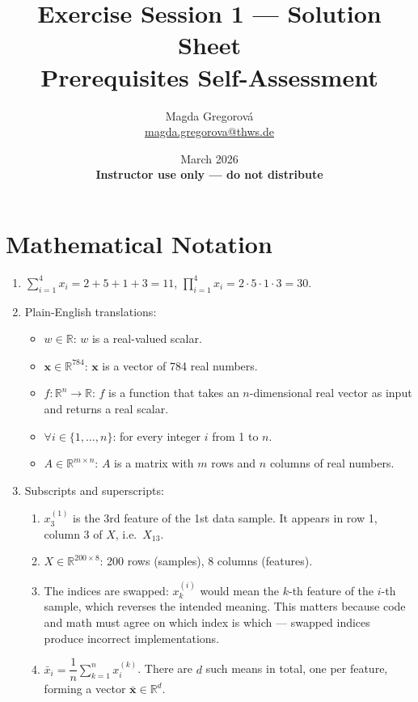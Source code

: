 \documentclass[12pt, a4paper]{scrartcl}
\title{Exercise Session 1 --- Solution Sheet\\
\large Prerequisites Self-Assessment}
\author{Magda Gregorová\\
{\small \href{mailto:magda.gregorova@thws.de}{magda.gregorova@thws.de}}}
\date{{\small March 2026 \\[0.3em]
\textbf{Instructor use only --- do not distribute}}}
\begin{document}
\maketitle
\tableofcontents
\newpage

\section{Mathematical Notation}

\begin{enumerate}

\item
$\displaystyle\sum_{i=1}^{4} x_i = 2 + 5 + 1 + 3 = 11$, \quad
$\displaystyle\prod_{i=1}^{4} x_i = 2 \cdot 5 \cdot 1 \cdot 3 = 30$.

\item Plain-English translations:
\begin{itemize}
    \item $w \in \mathbb{R}$: $w$ is a real-valued scalar.
    \item $\mathbf{x} \in \mathbb{R}^{784}$: $\mathbf{x}$ is a vector of 784 real numbers.
    \item $f: \mathbb{R}^n \to \mathbb{R}$: $f$ is a function that takes an $n$-dimensional real vector as input and returns a real scalar.
    \item $\forall i \in \{1, \ldots, n\}$: for every integer $i$ from 1 to $n$.
    \item $A \in \mathbb{R}^{m \times n}$: $A$ is a matrix with $m$ rows and $n$ columns of real numbers.
\end{itemize}

\item Subscripts and superscripts:
\begin{enumerate}
    \item $x_3^{(1)}$ is the 3rd feature of the 1st data sample. It appears in row 1, column 3 of $X$, i.e.\ $X_{13}$.
    \item $X \in \mathbb{R}^{200 \times 8}$: 200 rows (samples), 8 columns (features).
    \item The indices are swapped: $x_k^{(i)}$ would mean the $k$-th feature of the $i$-th sample, which reverses the intended meaning. This matters because code and math must agree on which index is which --- swapped indices produce incorrect implementations.
    \item $\bar{x}_i = \dfrac{1}{n}\displaystyle\sum_{k=1}^{n} x_i^{(k)}$. There are $d$ such means in total, one per feature, forming a vector $\bar{\mathbf{x}} \in \mathbb{R}^d$.
\end{enumerate}


\end{enumerate}
\end{document}
